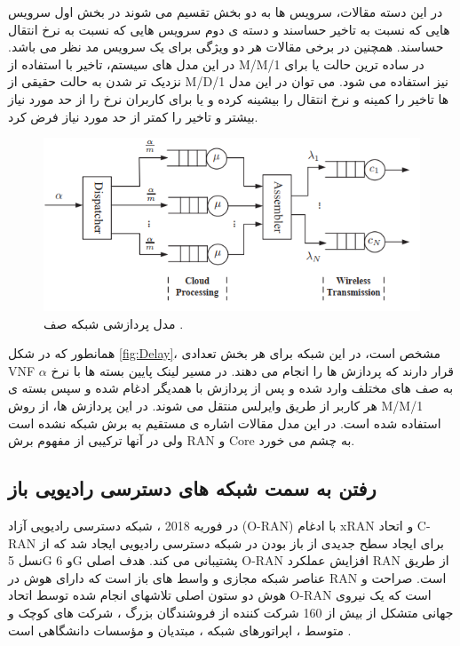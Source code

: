 در این دسته مقالات، سرویس ها به دو بخش تقسیم می شوند در بخش اول سرویس هایی که  نسبت به تاخیر حساسند و دسته ی دوم سرویس هایی که نسبت به نرخ انتقال حساسند. همچنین در برخی مقالات هر دو ویژگی برای یک سرویس مد نظر می باشد.
در این مدل های سیستم، تاخیر با استفاده از M/M/1 در ساده ترین حالت یا برای نزدیک تر شدن به حالت حقیقی از M/D/1 نیز استفاده می شود. می توان در این مدل ها تاخیر را کمینه و نرخ انتقال را بیشینه کرده و یا 
برای کاربران نرخ را از حد مورد نیاز بیشتر و تاخیر را کمتر از حد مورد نیاز فرض کرد\cite{frdl,luong2018novel,luong2018novel1,guo2016exploiting}.
 \begin{figure}%
  \centering
    \includegraphics[scale = 0.7]{./fig/Delay}
  \caption{مدل پردازشی شبکه صف \cite{frdl}.}
  \label{fig:Delay}
\end{figure}
همانطور که در شکل \eqref{fig:Delay}، مشخص است، در این شبکه برای هر بخش تعدادی VNF قرار دارند که پردازش ها را انجام می دهند. در مسیر لینک پایین
بسته ها با نرخ $\alpha$ به صف های مختلف وارد شده و پس از پردازش با همدیگر ادغام شده و سپس بسته ی هر کاربر از طریق وایرلس منتقل می شوند.
در این پردازش ها، از روش M/M/1 استفاده شده است.
در این مدل مقالات اشاره ی مستقیم به برش شبکه نشده است ولی
در آنها ترکیبی از مفهوم برش RAN و Core به چشم می خورد.
\subsection{رفتن به سمت شبکه های دسترسی رادیویی باز}
در فوریه 2018 ، شبکه دسترسی رادیویی آزاد (O-RAN) با ادغام  xRAN و اتحاد C-RAN برای ایجاد سطح جدیدی از باز بودن در شبکه دسترسی رادیویی ایجاد شد که از نسل 5G و 6G پشتیبانی می کند.
هدف اصلی O-RAN افزایش عملکرد RAN از طریق عناصر شبکه مجازی و واسط های باز است که دارای هوش در RAN است.
صراحت و هوش دو ستون اصلی تلاشهای انجام شده توسط اتحاد O-RAN است که یک نیروی جهانی متشکل از بیش از 160 شرکت کننده از فروشندگان بزرگ ، شرکت های کوچک و متوسط ، اپراتورهای شبکه ، مبتدیان و مؤسسات دانشگاهی است
\cite{oranpaper}
.

